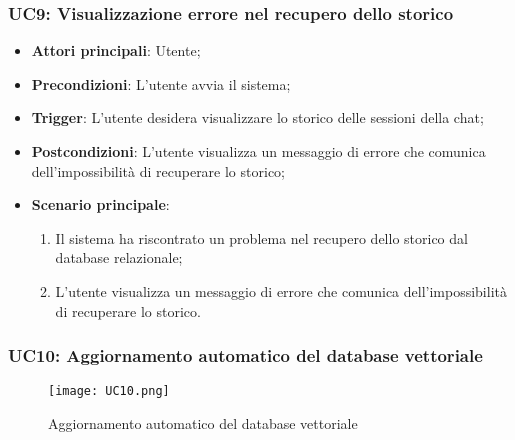 \subsubsection{UC9: Visualizzazione errore nel recupero dello storico}
\begin{itemize}
    \item \textbf{Attori principali}: Utente;
    \item \textbf{Precondizioni}: L'utente avvia il sistema;
    \item \textbf{Trigger}: L'utente desidera visualizzare lo storico delle sessioni della chat;
    \item \textbf{Postcondizioni}: L'utente visualizza un messaggio di errore che comunica dell'impossibilità di recuperare lo storico;
    \item \textbf{Scenario principale}: 
    \begin{enumerate}
        \item Il sistema ha riscontrato un problema nel recupero dello storico dal database relazionale;
        \item L'utente visualizza un messaggio di errore che comunica dell'impossibilità di recuperare lo storico.
    \end{enumerate}
\end{itemize}

\newpage

\hypertarget{UC10}{}
\subsubsection{UC10: Aggiornamento automatico del database vettoriale}

\begin{figure}[h]
    \centering
    \texttt{[image: UC10.png]}
    \caption{Aggiornamento automatico del database vettoriale}
\end{figure}

